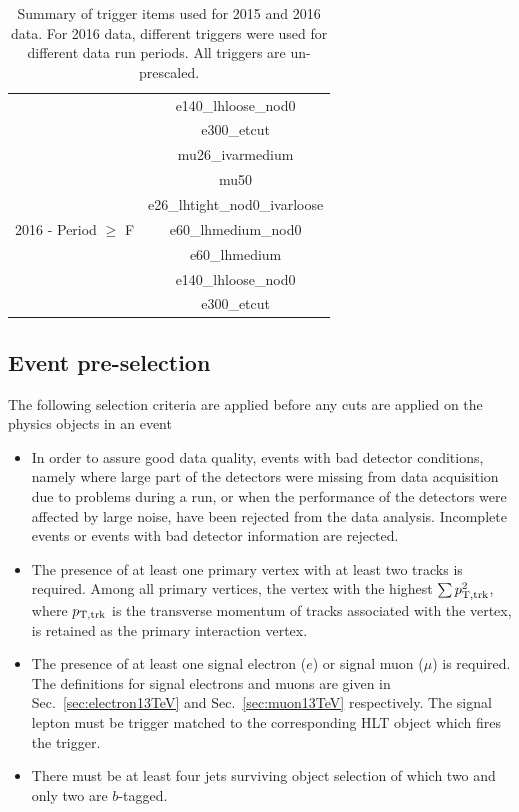 \begin{table}[htbp!]
\begin{center}
\begin{tabular}{|c|c|}
   & e140\_lhloose\_nod0  \\
   & e300\_etcut  \\
  \hline
  \multirow{7}{*}{2016 - Period $\ge$ F} & mu26\_ivarmedium   \\
   & mu50  \\
   & e26\_lhtight\_nod0\_ivarloose  \\
   & e60\_lhmedium\_nod0  \\
   & e60\_lhmedium  \\
   & e140\_lhloose\_nod0  \\
   & e300\_etcut  \\
  \hline
 \end{tabular}
\end{center}
\caption{Summary of trigger items used for 2015 and 2016 data. For 2016 data, different triggers were used for different data run periods. 
All triggers are un-prescaled.}
\label{tab:triggers}
\end{table}

\subsection{Event pre-selection}
The following selection criteria are applied before any cuts are applied on the physics objects in an event
\begin{itemize}
\item In order to assure good data quality, events with bad detector conditions, namely where large part of the detectors were missing from data acquisition due to problems during a run, or when the performance of the detectors were affected by large noise, have been rejected from the data analysis. Incomplete events or events with bad detector information are rejected. 
\item The presence of at least one primary vertex with at least two tracks is required. Among all primary vertices, the vertex with the highest $\sum p_{{\rm T,trk}}^{2}$, where $p_{{\rm T,trk}}$ is the transverse momentum of tracks associated with the vertex, is retained as the primary interaction vertex.
\item The presence of at least one signal electron ($e$) or signal muon ($\mu$) is required. The definitions for signal electrons and muons are given in Sec.~\ref{sec:electron13TeV} and Sec.~\ref{sec:muon13TeV} respectively. The signal lepton must be trigger matched to the corresponding HLT object which fires the trigger.
\item There must be at least four jets surviving object selection of which two and only two are $b$-tagged.
\end{itemize}


